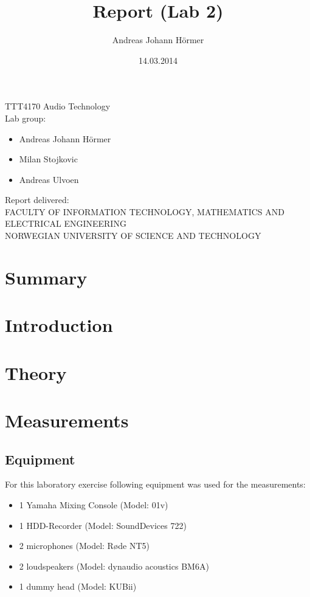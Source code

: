 \documentclass{article}
\title{Report  (Lab 2)}
\author{Andreas Johann H\"ormer}
\date{14.03.2014}
\begin{document}
\thispagestyle{empty}
\maketitle
\thispagestyle{empty}
\begin{center}
TTT4170 Audio Technology\\[3cm]
Lab group:
\begin{itemize}
\item Andreas Johann H\"ormer
\item Milan Stojkovic
\item Andreas Ulvoen\\[3cm]
\end{itemize}
Report delivered: \\[6cm]
FACULTY OF INFORMATION TECHNOLOGY, MATHEMATICS AND ELECTRICAL ENGINEERING\\
NORWEGIAN UNIVERSITY OF SCIENCE AND TECHNOLOGY
\end{center}
\thispagestyle{empty}
\tableofcontents
\thispagestyle{empty}
\newpage
\section*{Summary}
\thispagestyle{empty}

\newpage
\setcounter{page}{1}
\section{Introduction}

\section{Theory}

\section{Measurements}
\subsection{Equipment}
For this laboratory exercise following equipment was used for the measurements:
\begin{itemize}
\item 1 Yamaha Mixing Console (Model: 01v)
\item 1 HDD-Recorder (Model: SoundDevices 722)
\item 2 microphones (Model: Røde NT5)
\item 2 loudspeakers (Model: dynaudio acoustics BM6A)
\item 1 dummy head (Model: KUBii)
\end{itemize}
\end{document}
